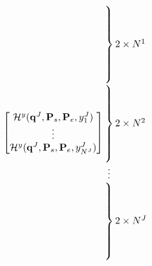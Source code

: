 \begin{equation}
\begin{bmatrix}
 \mathcal{H}^y(\mathbf{q}^J,\mathbf{P}_s,\mathbf{P}_e,y^J_1)\\
 \vdots\\
 \mathcal{H}^y(\mathbf{q}^J,\mathbf{P}_s,\mathbf{P}_e,y^J_{N^J})
\end{bmatrix}
\begin{array}{@{\kern-\nulldelimiterspace}l@{}}
 \left.\begin{array}{@{}c@{}}\\ \\ \\ \\ \\ \\[8pt] \end{array}\right\}2\times N^1\\
 \left.\begin{array}{@{}c@{}}\\ \\ \\ \\ \\ \\[8pt] \end{array}\right\}2\times N^2\\
 \left.\begin{array}{@{}c@{}}\\                     \end{array}\right. \vdots     \\
 \left.\begin{array}{@{}c@{}}\\ \\ \\ \\ \\ \\[8pt] \end{array}\right\}2\times N^J\\
\end{array}
\end{equation}




